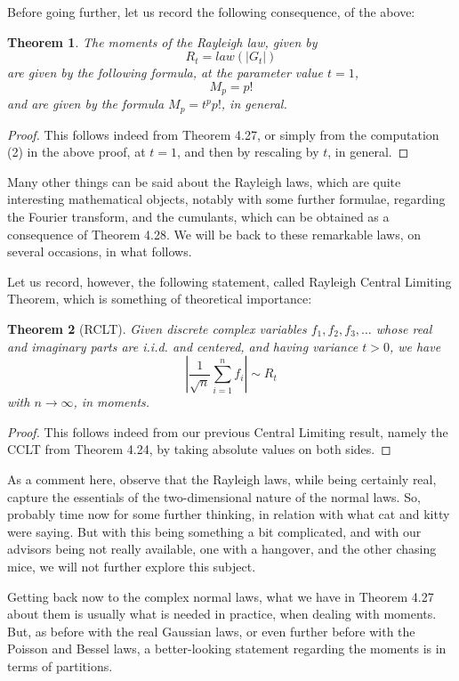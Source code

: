 \documentclass[12pt]{amsbook}
\newtheorem{theorem}{Theorem}[chapter]
\begin{document}
Before going further, let us record the following consequence, of the above:

\begin{theorem}
The moments of the Rayleigh law, given by
$$R_t=law(|G_t|)$$
are given by the following formula, at the parameter value $t=1$,
$$M_p=p!$$ 
and are given by the formula $M_p=t^pp!$, in general.
\end{theorem} 

\begin{proof}
This follows indeed from Theorem 4.27, or simply from the computation (2) in the above proof, at $t=1$, and then by rescaling by $t$, in general.
\end{proof}

Many other things can be said about the Rayleigh laws, which are quite interesting mathematical objects, notably with some further formulae, regarding the Fourier transform, and the cumulants, which can be obtained as a consequence of Theorem 4.28. We will be back to these remarkable laws, on several occasions, in what follows.

\bigskip

Let us record, however, the following statement, called Rayleigh Central Limiting Theorem, which is something of theoretical importance:

\begin{theorem}[RCLT]
Given discrete complex variables $f_1,f_2,f_3,\ldots$ whose real and imaginary parts are i.i.d. and centered, and having variance $t>0$, we have
$$\left|\frac{1}{\sqrt{n}}\sum_{i=1}^nf_i\right|\sim R_t$$
with $n\to\infty$, in moments.
\end{theorem}

\begin{proof}
This follows indeed from our previous Central Limiting result, namely the CCLT from Theorem 4.24, by taking absolute values on both sides.
\end{proof}

As a comment here, observe that the Rayleigh laws, while being certainly real, capture the essentials of the two-dimensional nature of the normal laws. So, probably time now for some further thinking, in relation with what cat and kitty were saying. But with this being something a bit complicated, and with our advisors being not really available, one with a hangover, and the other chasing mice, we will not further explore this subject.

\bigskip

Getting back now to the complex normal laws, what we have in Theorem 4.27 about them is usually what is needed in practice, when dealing with moments. But, as before with the real Gaussian laws, or even further before with the Poisson and Bessel laws, a better-looking statement regarding the moments is in terms of partitions.
\end{document}
